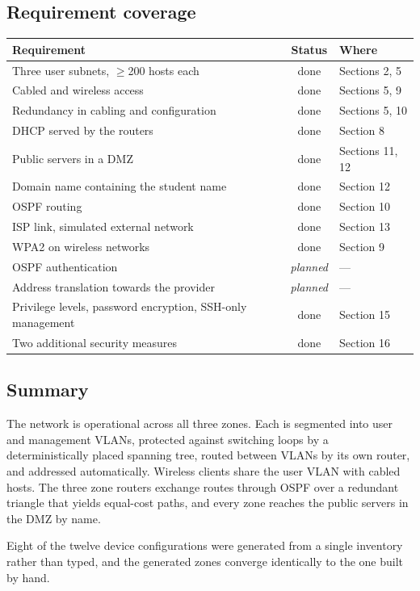 \documentclass[12pt,a4paper]{article}
\begin{document}
\subsection{Requirement coverage}

\begin{table}[H]
\centering
\renewcommand{\arraystretch}{1.2}
\begin{tabular}{@{} p{7cm} c l @{}}
\toprule
\textbf{Requirement} & \textbf{Status} & \textbf{Where} \\
\midrule
Three user subnets, $\geq$200 hosts each & done & Sections 2, 5 \\
Cabled and wireless access               & done & Sections 5, 9 \\
Redundancy in cabling and configuration  & done & Sections 5, 10 \\
DHCP served by the routers               & done & Section 8 \\
Public servers in a DMZ                  & done & Sections 11, 12 \\
Domain name containing the student name  & done & Section 12 \\
OSPF routing                             & done & Section 10 \\
ISP link, simulated external network      & done & Section 13 \\
WPA2 on wireless networks                & done & Section 9 \\
OSPF authentication                      & \textit{planned} & ---  \\
Address translation towards the provider & \textit{planned} & ---  \\
Privilege levels, password encryption, SSH-only management & done & Section 15 \\
Two additional security measures         & done & Section 16 \\
\bottomrule
\end{tabular}
\end{table}

\subsection{Summary}

The network is operational across all three zones. Each is segmented into user
and management VLANs, protected against switching loops by a deterministically
placed spanning tree, routed between VLANs by its own router, and addressed
automatically. Wireless clients share the user VLAN with cabled hosts. The three
zone routers exchange routes through OSPF over a redundant triangle that yields
equal-cost paths, and every zone reaches the public servers in the DMZ by name.

Eight of the twelve device configurations were generated from a single inventory
rather than typed, and the generated zones converge identically to the one built
by hand.
\end{document}
